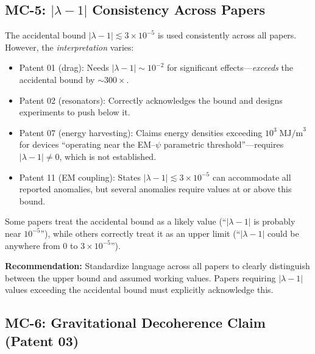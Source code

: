 \documentclass[12pt,a4paper]{article}
\begin{document}
\subsection{MC-5: $|\lambda - 1|$ Consistency Across Papers}

\begin{moderate}
The accidental bound $|\lambda - 1| \lesssim 3\times 10^{-5}$ is used
consistently across all papers. However, the \textit{interpretation} varies:

\begin{itemize}[nosep]
\item Patent 01 (drag): Needs $|\lambda - 1| \sim 10^{-2}$ for significant
effects---\textit{exceeds} the accidental bound by $\sim 300\times$.
\item Patent 02 (resonators): Correctly acknowledges the bound and designs
experiments to push below it.
\item Patent 07 (energy harvesting): Claims energy densities exceeding
$10^3\;\text{MJ/m}^3$ for devices ``operating near the EM--$\psi$ parametric
threshold''---requires $|\lambda-1| \neq 0$, which is not established.
\item Patent 11 (EM coupling): States $|\lambda - 1| \lesssim 3\times 10^{-5}$
can accommodate all reported anomalies, but several anomalies require values
at or above this bound.
\end{itemize}

Some papers treat the accidental bound as a likely value (``$|\lambda-1|$ is
probably near $10^{-5}$''), while others correctly treat it as an upper limit
(``$|\lambda-1|$ could be anywhere from 0 to $3\times 10^{-5}$'').

\textbf{Recommendation:} Standardize language across all papers to
clearly distinguish between the upper bound and assumed working values.
Papers requiring $|\lambda - 1|$ values exceeding the accidental bound
must explicitly acknowledge this.
\end{moderate}

\subsection{MC-6: Gravitational Decoherence Claim (Patent 03)}
\end{document}
